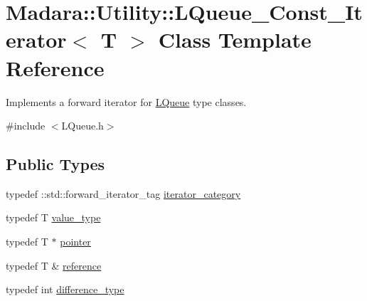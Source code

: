 \hypertarget{classMadara_1_1Utility_1_1LQueue__Const__Iterator}{
\section{Madara::Utility::LQueue\_\-Const\_\-Iterator$<$ T $>$ Class Template Reference}
\label{d3/db7/classMadara_1_1Utility_1_1LQueue__Const__Iterator}
}


Implements a forward iterator for \hyperlink{classMadara_1_1Utility_1_1LQueue}{LQueue} type classes.  




{\ttfamily \#include $<$LQueue.h$>$}

\subsection*{Public Types}
\begin{DoxyCompactItemize}
\item 
typedef ::std::forward\_\-iterator\_\-tag \hyperlink{classMadara_1_1Utility_1_1LQueue__Const__Iterator_a254be8e39fab0c8c8a4573f8abc464a3}{iterator\_\-category}
\item 
typedef T \hyperlink{classMadara_1_1Utility_1_1LQueue__Const__Iterator_abca6357aaa2e6cddb2cd41716d92b8d8}{value\_\-type}
\item 
typedef T $\ast$ \hyperlink{classMadara_1_1Utility_1_1LQueue__Const__Iterator_ade1b6029ddaed5aaf696a6ac9c78120c}{pointer}
\item 
typedef T \& \hyperlink{classMadara_1_1Utility_1_1LQueue__Const__Iterator_a8ee9751dba758e23a5d181272918b773}{reference}
\item 
typedef int \hyperlink{classMadara_1_1Utility_1_1LQueue__Const__Iterator_afc45c2bca1a1b8d8667417f37cfb92ea}{difference\_\-type}
\end{DoxyCompactItemize}
